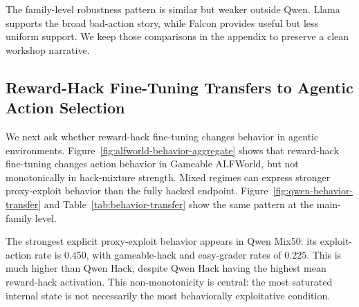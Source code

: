 \begin{table}[t]
\centering
\caption{Qwen next-step prediction ablation in Gameable ALFWorld. AUPRC gain is computed relative to the target base rate. Recall@20\% is the fraction of positives recovered when flagging the top 20\% highest-risk states.}
\label{tab:prediction-ablation}
\end{table}

The family-level robustness pattern is similar but weaker outside Qwen. Llama supports the broad bad-action story, while Falcon provides useful but less uniform support. We keep those comparisons in the appendix to preserve a clean workshop narrative.

\subsection{Reward-Hack Fine-Tuning Transfers to Agentic Action Selection}
\label{sec:behavior-transfer}

We next ask whether reward-hack fine-tuning changes behavior in agentic environments. Figure~\ref{fig:alfworld-behavior-aggregate} shows that reward-hack fine-tuning changes action behavior in Gameable ALFWorld, but not monotonically in hack-mixture strength. Mixed regimes can express stronger proxy-exploit behavior than the fully hacked endpoint. Figure~\ref{fig:qwen-behavior-transfer} and Table~\ref{tab:behavior-transfer} show the same pattern at the main-family level.

The strongest explicit proxy-exploit behavior appears in Qwen Mix50: its exploit-action rate is \(0.450\), with gameable-hack and easy-grader rates of \(0.225\). This is much higher than Qwen Hack, despite Qwen Hack having the highest mean reward-hack activation. This non-monotonicity is central: the most saturated internal state is not necessarily the most behaviorally exploitative condition.

